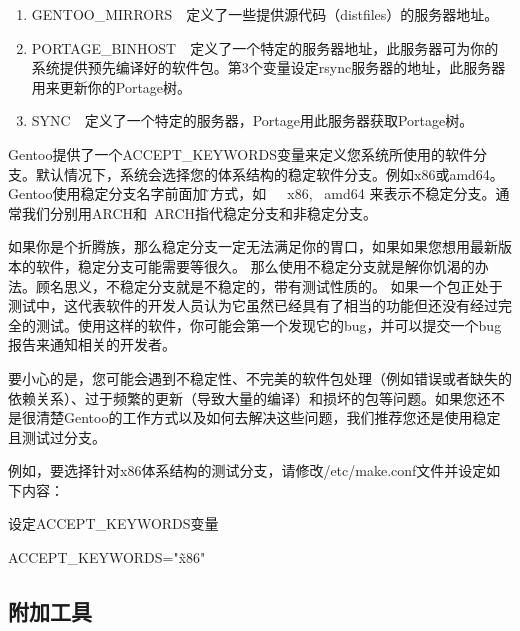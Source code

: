 \begin{enumerate}
\item GENTOO\_MIRRORS　定义了一些提供源代码（distfiles）的服务器地址。
\item PORTAGE\_BINHOST　定义了一个特定的服务器地址，此服务器可为你的系统提供预先编译好的软件包。第3个变量设定rsync服务器的地址，此服务器用来更新你的Portage树。
\item SYNC　定义了一个特定的服务器，Portage用此服务器获取Portage树。
\end{enumerate}

\vspace{3ex}

Gentoo提供了一个ACCEPT\_KEYWORDS变量来定义您系统所使用的软件分支。默认情况下，系统会选择您的体系结构的稳定软件分支。例如x86或amd64。
Gentoo使用稳定分支名字前面加\~的方式，如　~x86, ~amd64 来表示不稳定分支。通常我们分别用ARCH和~ARCH指代稳定分支和非稳定分支。

如果你是个折腾族，那么稳定分支一定无法满足你的胃口，如果如果您想用最新版本的软件，稳定分支可能需要等很久。
那么使用不稳定分支就是解你饥渴的办法。顾名思义，不稳定分支就是不稳定的，带有测试性质的。
如果一个包正处于测试中，这代表软件的开发人员认为它虽然已经具有了相当的功能但还没有经过完全的测试。使用这样的软件，你可能会第一个发现它的bug，并可以提交一个bug报告来通知相关的开发者。

要小心的是，您可能会遇到不稳定性、不完美的软件包处理（例如错误或者缺失的依赖关系）、过于频繁的更新（导致大量的编译）和损坏的包等问题。如果您还不是很清楚Gentoo的工作方式以及如何去解决这些问题，我们推荐您还是使用稳定且测试过分支。

例如，要选择针对x86体系结构的测试分支，请修改/etc/make.conf文件并设定如下内容：

\begin{example}{设定ACCEPT\_KEYWORDS变量}
\begin{code}
ACCEPT\_KEYWORDS="\~x86"
\end{code}
\end{example}

\subsection{附加工具}

